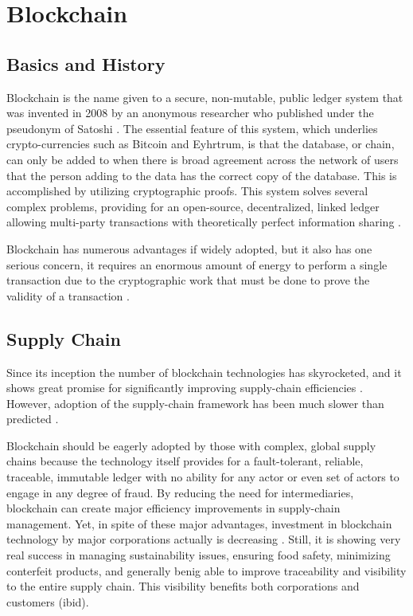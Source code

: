 \section{Blockchain}

\subsection{Basics and History}

Blockchain is the name given to a secure, non-mutable, public ledger system that was invented in 2008 by an anonymous researcher who published under the pseudonym of Satoshi \Textcite{nakamotoBitcoinPeertoPeerElectronic2008}. The essential feature of this system, which underlies crypto-currencies such as Bitcoin and Eyhrtrum, is that the database, or chain, can only be added to when there is broad agreement across the network of users that the person adding to the data has the correct copy of the database. This is accomplished by utilizing cryptographic proofs. This system solves several complex problems, providing for an open-source, decentralized, linked ledger allowing multi-party transactions with theoretically perfect information sharing \parencite{kristofferfranciscoSupplyChainHas2018}.

Blockchain has numerous advantages if widely adopted, but it also has one serious concern, it requires an enormous amount of energy to perform a single transaction due to the cryptographic work that must be done to prove the validity of a transaction \parencite{kouhizadehBlockchainTechnologySustainable2021}.

\subsection{Supply Chain}

Since its inception the number of blockchain technologies has skyrocketed, and it shows great promise for significantly improving supply-chain efficiencies \parencite{wongTimeSeizeDigital2020}. However, adoption of the supply-chain framework has been much slower than predicted \parencite{alazabBlockchainTechnologySupply2020}.

Blockchain should be eagerly adopted by those with complex, global supply chains because the technology itself provides for a fault-tolerant, reliable, traceable, immutable ledger with no ability for any actor or even set of actors to engage in any degree of fraud. By reducing the need for intermediaries, blockchain can create major efficiency improvements in supply-chain management. Yet, in spite of these major advantages, investment in blockchain technology by major corporations actually is decreasing \parencite{kouhizadehBlockchainTechnologySustainable2021}. Still, it is showing very real success in managing sustainability issues, ensuring food safety, minimizing conterfeit products, and generally benig able to improve traceability and visibility to the entire supply chain. This visibility benefits both corporations and customers (ibid).

